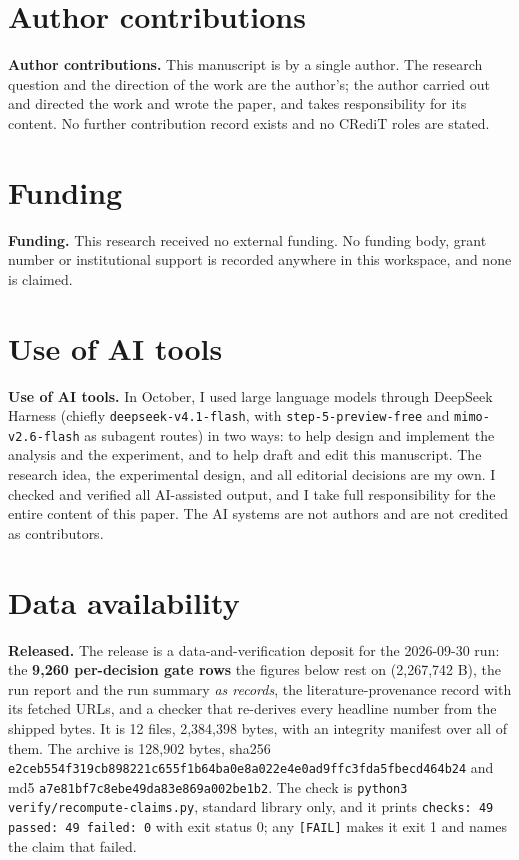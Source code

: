 \documentclass[10pt]{article}
\begin{document}
\section*{Author contributions}

\textbf{Author contributions.} This manuscript is by a single author. The research question and the direction of the work are the author's; the author carried out and directed the work and wrote the paper, and takes responsibility for its content. No further contribution record exists and no CRediT roles are stated.

\section*{Funding}

\textbf{Funding.} This research received no external funding. No funding body, grant number or institutional support is recorded anywhere in this workspace, and none is claimed.

\section*{Use of AI tools}

\textbf{Use of AI tools.} In October, I used large language models through DeepSeek Harness (chiefly \texttt{deepseek-v4.1-flash}, with \texttt{step-5-preview-free} and \texttt{mimo-v2.6-flash} as subagent routes) in two ways: to help design and implement the analysis and the experiment, and to help draft and edit this manuscript. The research idea, the experimental design, and all editorial decisions are my own. I checked and verified all AI-assisted output, and I take full responsibility for the entire content of this paper. The AI systems are not authors and are not credited as contributors.

\section*{Data availability}

\textbf{Released.} The release is a data-and-verification deposit for the 2026-09-30 run: the \textbf{9,260 per-decision gate rows} the figures below rest on (2,267,742 B), the run report and the run summary \emph{as records}, the literature-provenance record with its fetched URLs, and a checker that re-derives every headline number from the shipped bytes. It is 12 files, 2,384,398 bytes, with an integrity manifest over all of them. The archive is 128,902 bytes, sha256 \texttt{e2ceb554f319cb898221c655f1b64ba0e8a022e4e0ad9ffc3fda5fbecd464b24} and md5 \texttt{a7e81bf7c8ebe49da83e869a002be1b2}. The check is \texttt{python3 verify/recompute-claims.py}, standard library only, and it prints \texttt{checks: 49 passed: 49 failed: 0} with exit status 0; any \texttt{[FAIL]} makes it exit 1 and names the claim that failed.
\end{document}
